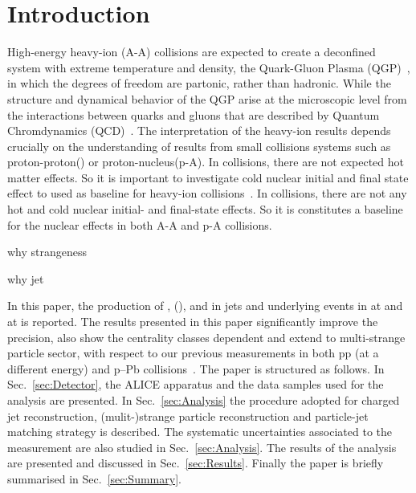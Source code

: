 
\section{Introduction}%
\label{sec:Introduction}

High-energy heavy-ion (A-A) collisions are expected to create a deconfined system with extreme temperature and density, the Quark-Gluon Plasma (QGP)~\cite{Rafelski:126179, Satz:2000bn, Shuryak:1983ni, Jacak:2012dx, Cleymans:1985wb, Bass:1998vz, BraunMunzinger:2007zz}, in which the degrees of freedom are partonic, rather than hadronic.
While the structure and dynamical behavior of the QGP arise at the microscopic level from the interactions between quarks and gluons that are described by Quantum Chromdynamics (QCD)~\cite{Laermann:2003cv, Gupta:2011wh, Bhattacharya:2014ara}.
The interpretation of the heavy-ion results depends crucially on the understanding of results from small collisions systems such as proton-proton(\pp) or proton-nucleus(p-A).
In \pPb collisions, there are not expected hot matter effects.
So it is important to investigate cold nuclear initial and final state effect to used as baseline for heavy-ion collisions~\cite{Salgado:2011wc, Eskola:2016oht}.
In \pp collisions, there are not any hot and cold nuclear initial- and final-state effects.
So it is constitutes a baseline for the nuclear effects in both A-A and p-A collisions.

why strangeness

why jet


In this paper, the production of \kzero, \lmb (\almb), \Xis and \Oms in jets and underlying events in \pp at \thirteen and \pPb at \fivenn is reported.
The results presented in this paper significantly improve the precision, also show the centrality classes dependent and extend to multi-strange particle sector, with respect to our previous measurements in both pp (at a different energy) and p–Pb collisions~\cite{V0injet}. 
The paper is structured as follows.
In Sec.~\ref{sec:Detector}, the ALICE apparatus and the data samples used for the analysis are presented. In Sec.~\ref{sec:Analysis} the procedure adopted for charged jet reconstruction, (mulit-)strange particle reconstruction and particle-jet matching strategy is described. 
The systematic uncertainties associated to the measurement are also studied in Sec.~\ref{sec:Analysis}.
The results of the analysis are presented and discussed in Sec.~\ref{sec:Results}.  Finally the paper is briefly summarised in Sec.~\ref{sec:Summary}.